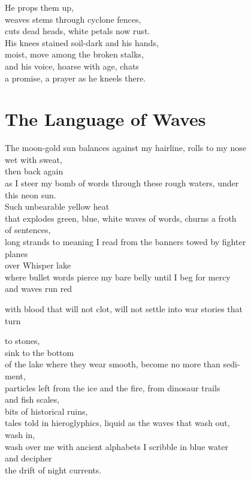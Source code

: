 \documentclass[twoside,10pt]{book}
\begin{document}
He props them up,\\
weaves stems through cyclone fences,\\
cuts dead heads, white petals now rust.\\
His knees stained soil-dark and his hands,\\
moist, move among the broken stalks,\\
and his voice, hoarse with age, chats\\
a promise, a prayer as he kneels there.


\clearpage
\section{The Language of Waves}

The moon-gold sun balances against my hairline, rolls to my nose\\
wet with sweat,\\
then back again\\
as I steer my bomb of words through these rough waters, under\\
this neon sun.\\
Such unbearable yellow heat\\
that explodes green, blue, white waves of words, churns a froth\\
of sentences,\\
long strands to meaning I read from the banners towed by fighter\\
planes\\
over Whisper lake\\
where bullet words pierce my bare belly until I beg for mercy\\
and waves run red

with blood that will not clot, will not settle into war stories that\\
turn

to stones,\\
sink to the bottom\\
of the lake where they wear smooth, become no more than sedi-\\
ment,\\
particles left from the ice and the fire, from dinosaur trails\\
and fish scales,\\
bits of historical ruins,\\
tales told in hieroglyphics, liquid as the waves that wash out,\\
wash in,\\
wash over me with ancient alphabets I scribble in blue water\\
and decipher\\
the drift of night currents.
\end{document}
